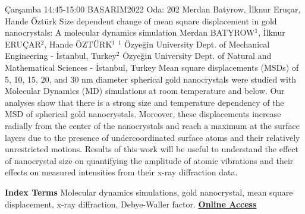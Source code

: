 
    \begin{abstract_basarim}
    {Çarşamba 14:45-15:00}
    {BASARIM2022}
    {Oda: 202}
    {Merdan Batyrow, İlknur Eruçar, Hande Öztürk}
    {Size dependent change of mean square displacement in gold nanocrystals: \newline A molecular dynamics simulation}
    {%
    Merdan BATYROW$^{1}$, İlknur ERUÇAR$^{2}$, Hande ÖZTÜRK$^{1}$}
    {%
    }
    {%
    $^1$ Özyeğin University Dept. of Mechanical Engineering - İstanbul, Turkey\newline{}$^2$ Özyeğin University Dept. of Natural and Mathematical Sciences - İstanbul, Turkey}
    Mean square displacements (MSDs) of 5, 10, 15, 20, and 30 nm diameter spherical gold nanocrystals were studied with Molecular Dynamics (MD) simulations at room temperature and below. Our analyses show that there is a strong size and temperature dependency of the MSD of spherical gold nanocrystals. Moreover, these displacements increase radially from the center of the nanocrystals and reach a maximum at the surface layers due to the presence of undercoordinated surface atoms and their relatively unrestricted motions. Results of this work will be useful to understand the effect of nanocrystal size on quantifying the amplitude of atomic vibrations and their effects on measured intensities from their x-ray diffraction data. 
    
            \textbf{Index Terms} \newline{}Molecular dynamics simulations, gold nanocrystal, mean square displacement, x-ray diffraction, Debye-Waller factor.
     \newline\newline\noindent \href{https://drive.google.com/file/d/1QxujenEGqb3_bqsCYzqP4KKPv7BGBV6d/view?usp=drivesdk}{\bfseries Online Access}
    \end{abstract_basarim}
    